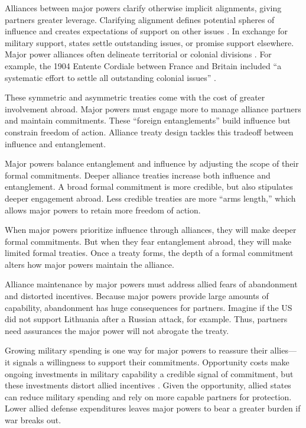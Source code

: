 \documentclass[12pt]{article}
\begin{document}
Alliances between major powers clarify otherwise implicit alignments, giving partners greater leverage. 
Clarifying alignment defines potential spheres of influence and creates expectations of support on other issues \citep{Snyder1997}. 
In exchange for military support, states settle outstanding issues, or promise support elsewhere. 
Major power alliances often delineate territorial or colonial divisions \cite{Langer1950, Kissinger1994}.
For example, the 1904 Entente Cordiale between France and Britain included ``a systematic effort to settle all outstanding colonial issues'' \citep[pg. 189]{Kissinger1994}.   


These symmetric and asymmetric treaties come with the cost of greater involvement abroad.
Major powers must engage more to manage alliance partners and maintain commitments.
These ``foreign entanglements'' build influence but constrain freedom of action.
Alliance treaty design tackles this tradeoff between influence and entanglement. 


Major powers balance entanglement and influence by adjusting the scope of their formal commitments. 
Deeper alliance treaties increase both influence and entanglement. 
A broad formal commitment is more credible, but also stipulates deeper engagement abroad. 
Less credible treaties are more ``arms length,'' which allows major powers to retain more freedom of action. 


When major powers prioritize influence through alliances, they will make deeper formal commitments.
But when they fear entanglement abroad, they will make limited formal treaties. 
Once a treaty forms, the depth of a formal commitment alters how major powers maintain the alliance. 


Alliance maintenance by major powers must address allied fears of abandonment and distorted incentives. 
Because major powers provide large amounts of capability, abandonment has huge consequences for partners. 
Imagine if the US did not support Lithuania after a Russian attack, for example. 
Thus, partners need assurances the major power will not abrogate the treaty. 


Growing military spending is one way for major powers to reassure their allies--- it signals a willingness to support their commitments. 
Opportunity costs make ongoing investments in military capability a credible signal of commitment, but these investments distort allied incentives \citep{Lake1996, Lake2009}. 
Given the opportunity, allied states can reduce military spending and rely on more capable partners for protection.
Lower allied defense expenditures leaves major powers to bear a greater burden if war breaks out. 
\end{document}
